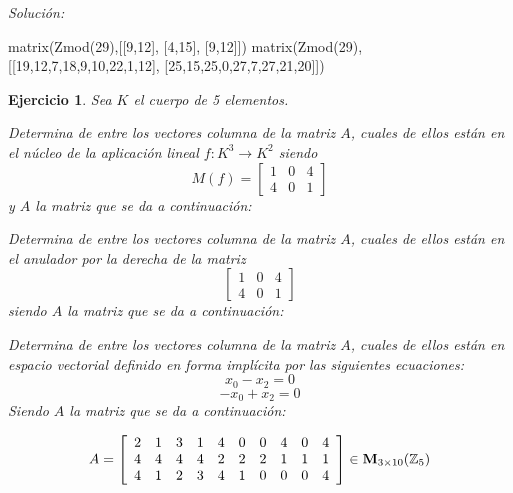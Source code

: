 \documentclass[12pt]{amsart}
\newtheorem{ejer}{Ejercicio}
\begin{document}
{\it Soluci\'on:}

\begin{sageblock}
matrix(Zmod(29),[[9,12],
[4,15],
[9,12]])
matrix(Zmod(29),[[19,12,7,18,9,10,22,1,12],
[25,15,25,0,27,7,27,21,20]])
\end{sageblock}



\begin{ejer} Sea $K$ el cuerpo de 5 elementos.
\newline
\noindent\begin{minipage}{\textwidth}
\begin{tcolorbox}[colback = green!20!white,title=Versión Núcleo]
Determina de entre los vectores columna de la matriz $A$, cuales de ellos están en el núcleo de la aplicación lineal $f:K^{3} \to K^{2}$ siendo  $$ M(f) = \left[\begin{array}{rrr}
1 & 0 & 4 \\
4 & 0 & 1
\end{array}\right] $$ y $A$ la matriz que se da a continuación:\end{tcolorbox}
\end{minipage} \newline
\noindent\begin{minipage}{\textwidth}
\begin{tcolorbox}[colback = blue!20!white,title=Versión Anulador]
Determina de entre los vectores columna de la matriz $A$, cuales de ellos están en el anulador por la derecha de la matriz $$ \left[\begin{array}{rrr}
1 & 0 & 4 \\
4 & 0 & 1
\end{array}\right] $$ siendo $A$ la matriz que se da a continuación:\end{tcolorbox}
\end{minipage} \newline
\noindent\begin{minipage}{\textwidth} 
\begin{tcolorbox}[colback = red!20!white,title=Versión Ecuaciones Implícitas]
Determina de entre los vectores columna de la matriz $A$, cuales de ellos están en espacio vectorial definido en forma implícita por las siguientes ecuaciones:
\[ x_{0} - x_{2} = 0 \]
\[ -x_{0} + x_{2} = 0 \]
Siendo $A$ la matriz que se da a continuación:
\end{tcolorbox}
\end{minipage}
\[ A = \left[\begin{array}{rrrrrrrrrr}
2 & 1 & 3 & 1 & 4 & 0 & 0 & 4 & 0 & 4 \\
4 & 4 & 4 & 4 & 2 & 2 & 2 & 1 & 1 & 1 \\
4 & 1 & 2 & 3 & 4 & 1 & 0 & 0 & 0 & 4
\end{array}\right] \in {\bf M}_{3\times 10}({\mathbb Z}_{5})\]
\end{ejer}
\end{document}
